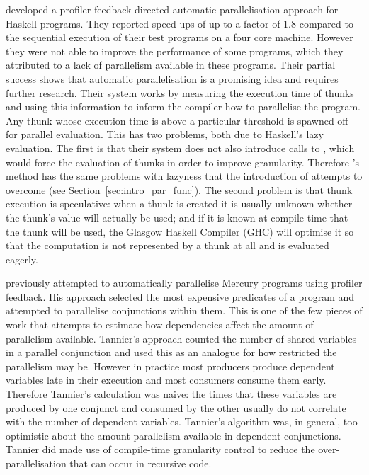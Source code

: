 \citet*{harris_07_feedback_imp_par} developed a profiler
feedback directed automatic parallelisation approach for Haskell programs.
They reported speed ups of up to a factor of 1.8 compared to the sequential
execution of their test programs on a four core machine.
However they were not able to improve the performance of some
programs,
which they attributed to a lack of parallelism available in these programs.
Their partial success shows that automatic parallelisation is a promising
idea and requires further research.
Their system works by measuring the execution time of thunks and using
this information to inform the compiler how to parallelise the program.
Any thunk whose execution time is above a particular threshold is
spawned off for parallel evaluation.
This has two problems, both due to Haskell's lazy evaluation.
The first is that their system does not also introduce calls to ,
which would force the evaluation of thunks in order to improve granularity.
Therefore \citeauthor{harris_07_feedback_imp_par}'s method
has the same problems with lazyness that the introduction of
 attempts to overcome (see Section~\ref{sec:intro_par_func}).
The second problem is that thunk execution is speculative:
when a thunk is created it is usually unknown whether the thunk's value
will actually be used;
and if it is known at compile time that the thunk will be used,
the Glasgow Haskell Compiler (GHC) will optimise it so that the computation
is not represented by a thunk at all and is evaluated eagerly.

\citet*{tannier:2007:parallel_mercury} previously attempted to automatically
parallelise Mercury programs using profiler feedback.
His approach selected the most expensive predicates
of a program and attempted to parallelise conjunctions within them.
This is one of the few pieces of work that attempts to estimate how
dependencies affect the amount of parallelism available.
Tannier's approach counted the number of shared variables in a parallel
conjunction and used this as an analogue for how restricted the
parallelism may be.
However in practice most producers produce dependent variables late in
their execution and most consumers consume them early.
Therefore Tannier's calculation was naive:
the times that these variables are produced by one conjunct and consumed
by the other usually do not correlate with the number of dependent variables.
Tannier's algorithm was, in general, too optimistic
about the amount parallelism available in dependent conjunctions.
Tannier did made use of compile-time granularity control to reduce the
over-parallelisation that can occur in recursive code.

